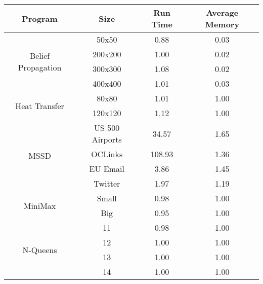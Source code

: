 \begin{tabular}{c | c || c | c} \hline
	\textbf{Program} & \textbf{Size} & \textbf{Run Time} & \textbf{Average Memory}\\ \hline \hline
	\multirow{4}{*}{Belief Propagation}  & 50x50 &  0.88  &  0.03
  \\
		 & 200x200 &  1.00  &  0.02
  \\
		 & 300x300 &  1.08  &  0.02
  \\
		 & 400x400 &  1.01  &  0.03
  \\
	\hline
	\multirow{2}{*}{Heat Transfer}  & 80x80 &  1.01  &  1.00
  \\
		 & 120x120 &  1.12  &  1.00
  \\
	\hline
	\multirow{4}{*}{MSSD}  & US 500 Airports &  34.57  &  1.65
  \\
		 & OCLinks &  108.93  &  1.36
  \\
		 & EU Email &  3.86  &  1.45
  \\
		 & Twitter &  1.97  &  1.19
  \\
	\hline
	\multirow{2}{*}{MiniMax}  & Small &  0.98  &  1.00
  \\
		 & Big &  0.95  &  1.00
  \\
	\hline
	\multirow{4}{*}{N-Queens}  & 11 &  0.98  &  1.00
  \\
		 & 12 &  1.00  &  1.00
  \\
		 & 13 &  1.00  &  1.00
  \\
		 & 14 &  1.00  &  1.00
  \\
	\hline
\end{tabular}
